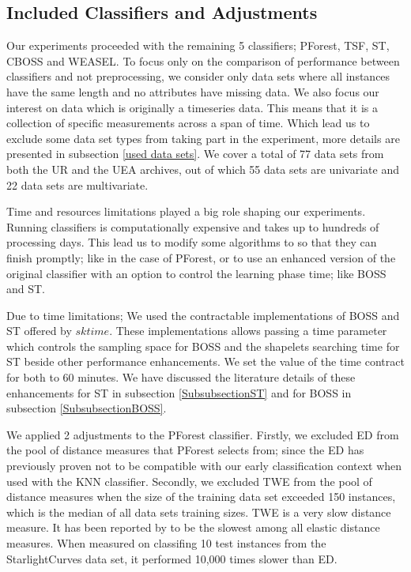 \subsection{Included Classifiers and Adjustments}
\label{SubsectionIncludedClassifiers}
Our experiments proceeded with the remaining 5 classifiers; PForest, TSF, ST, CBOSS and WEASEL.
To focus only on the comparison of performance between classifiers and not preprocessing, we consider only data sets where all instances have the same length and no attributes have missing data.
We also focus our interest on data which is originally a timeseries data. This means that it is a collection of specific measurements across a span of time.
Which lead us to exclude some data set types from taking part in the experiment, more details are presented in subsection \ref{used data sets}.
We cover a total of 77 data sets from both the UR and the UEA archives, out of which 55 data sets are univariate and 22 data sets are multivariate.

Time and resources limitations played a big role shaping our experiments. Running classifiers is computationally expensive \cite{schafer2020teaser}
and takes up to hundreds of processing days.
This lead us to modify some algorithms to so that they can finish promptly; like in the case of PForest, or to use an enhanced version of the original
classifier with an option to control the learning phase time; like BOSS and ST.

Due to time limitations; We used the contractable implementations of BOSS and ST offered by $sktime$.
These implementations allows passing a time parameter which controls the sampling space for BOSS and the shapelets searching time for ST
beside other performance enhancements.
We set the value of the time contract for both to 60 minutes.
We have discussed the literature details of these enhancements for ST in subsection \ref{SubsubsectionST} and for BOSS in subsection \ref{SubsubsectionBOSS}.

We applied 2 adjustments to the PForest classifier.
Firstly, we excluded ED from the pool of distance measures that PForest selects from; since the ED has previously proven not to be compatible with our early classification context when used with the KNN classifier.
Secondly, we excluded TWE from the pool of distance measures when the size of the training data set exceeded 150 instances, which is the median of all data sets training sizes.
TWE is a very slow distance measure. It has been reported by \cite{bagnall2017great} to be the slowest among all elastic distance measures. When measured on classifing 10 test instances from the
StarlightCurves data set, it performed 10,000 times slower than ED.

